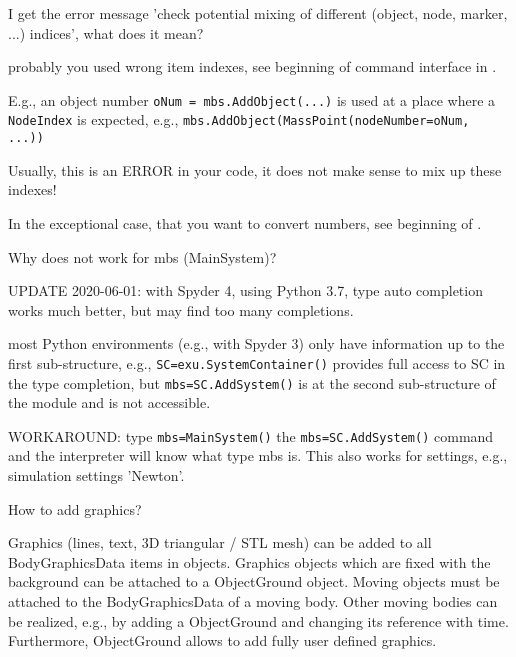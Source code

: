 \item I get the error message 'check potential mixing of different (object, node, marker, ...) indices', what does it mean?
\bi
\item[$\ra$] probably you used wrong item indexes, see beginning of command interface in . 
\item[$\ra$] E.g., an object number \texttt{oNum = mbs.AddObject(...)} is used at a place where a \texttt{NodeIndex} is expected, e.g., \texttt{mbs.AddObject(MassPoint(nodeNumber=oNum, ...))}
\item[$\ra$] Usually, this is an ERROR in your code, it does not make sense to mix up these indexes!
\item[$\ra$] In the exceptional case, that you want to convert numbers, see beginning of .
\ei
\item Why does  not work for mbs (MainSystem)?
\bi
\item[$\ra$] UPDATE 2020-06-01: with Spyder 4, using Python 3.7, type auto completion works much better, but may find too many completions.
\item[$\ra$] most Python environments (e.g., with Spyder 3) only have information up to the first sub-structure, e.g., \texttt{SC=exu.SystemContainer()} provides full access to SC in the type completion, but \texttt{mbs=SC.AddSystem()} is at the second sub-structure of the module and is not accessible.
\item[$\ra$] WORKAROUND: type \texttt{mbs=MainSystem()}  the \texttt{mbs=SC.AddSystem()} command and the interpreter will know what type mbs is. This also works for settings, e.g., simulation settings 'Newton'.
\ei
\item How to add graphics?
\bi
\item[$\ra$] Graphics (lines, text, 3D triangular / \acs{STL} mesh) can be added to all BodyGraphicsData items in objects. Graphics objects which are fixed with the background can be attached to a ObjectGround object. Moving objects must be attached to the BodyGraphicsData of a moving body. Other moving bodies can be realized, e.g., by adding a ObjectGround and changing its reference with time. Furthermore, ObjectGround allows to add fully user defined graphics.
